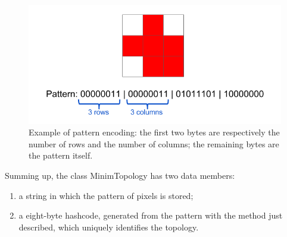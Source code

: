 \begin{figure}
  \centering
  \includegraphics[scale=0.5]{figures/pattern.png}
  \caption{Example of pattern encoding: the first two bytes are respectively the number of rows and the number of columns; the remaining bytes are the pattern itself.}
  \label{fig:pattern}
\end{figure}
%
Summing up, the class MinimTopology has two data members:
\begin{enumerate}
 \item a string in which the pattern of pixels is stored;
 \item a eight-byte hashcode, generated from the pattern with the method just described, which uniquely identifies the topology.
\end{enumerate}
%

